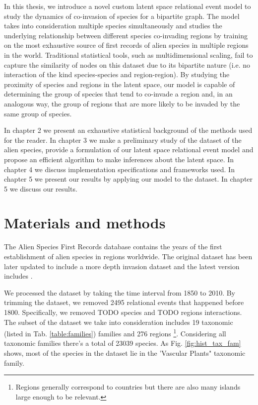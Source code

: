 \documentclass[mscthesis]{usiinfthesis}
\begin{document}
In this thesis, we introduce a novel custom latent space relational event model to study the dynamics of co-invasion of species for a bipartite graph. The model takes into consideration multiple species simultaneously and studies the underlying relationship between different species co-invading regions by training on the most exhaustive source of first records of alien species in multiple regions in the world. Traditional statistical tools, such as multidimensional scaling, fail to capture the similarity of nodes on this dataset due to its bipartite nature (i.e. no interaction of the kind species-species and region-region). By studying the proximity of species and regions in the latent space, our model is capable of determining the group of species that tend to co-invade a region and, in an analogous way, the group of regions that are more likely to be invaded by the same group of species. 

In chapter 2 we present an exhaustive statistical background of the methods used for the reader. In chapter 3 we make a preliminary study of the dataset of the alien species, provide a formulation of our latent space relational event model and propose an efficient algorithm to make inferences about the latent space. In chapter 4 we discuss implementation specifications and frameworks used. In chapter 5 we present our results by applying our model to the dataset. In chapter 5 we discuss our results.



\chapter{Materials and methods}

The Alien Species First Records database \cite{intro:dataset} contains the years of the first establishment of alien species in regions worldwide. The original dataset has been later updated to include a more depth invasion dataset \cite{intro:datasetv2} and the latest version includes  . 

We processed the dataset by taking the time interval from 1850 to 2010. By trimming the dataset, we removed 2495 relational events that happened before 1800. Specifically, we removed TODO species and TODO regions interactions. The subset of the dataset we take into consideration includes 19 taxonomic (listed in Tab. \ref{table:families}) families and 276 regions \footnote{Regions generally correspond to countries but there are also many islands large enough to be relevant.}. Considering all taxonomic families there's a total of 23039 species. As Fig. \ref{fig:hist_tax_fam} shows, most of the species in the dataset lie in the 'Vascular Plants" taxonomic family.
\end{document}
